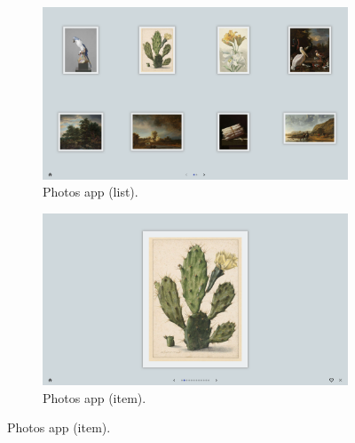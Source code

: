 \begin{figure}[p]
    \begin{subfigure}{.47\textwidth}
        \centering
        \includegraphics[width=.96\linewidth]{Figures/LUI/UI/photos-list.pdf}  
        \vspace{-5pt}
        \captionsetup{width=.9\linewidth}
        \caption{Photos app (list).}
        \label{fig:lui:screenshots:photos-list}
    \end{subfigure}
    \begin{subfigure}{.47\textwidth}
        \centering
        \includegraphics[width=.96\linewidth]{Figures/LUI/UI/photos-fullscreen.pdf}  
        \vspace{-5pt}
        \captionsetup{width=.9\linewidth}
        \caption{Photos app (item).}
        \label{fig:lui:screenshots:photos-fullscreen}
    \end{subfigure}


\end{figure}
